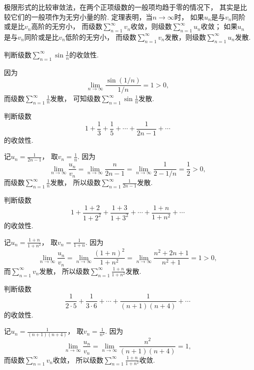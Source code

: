 极限形式的比较审敛法，在两个正项级数的一般项均趋于零的情况下，
其实是比较它们的一般项作为无穷小量的阶.
定理表明，当\(n \to \infty\)时，
如果\(u_n\)是与\(v_n\)同阶或是比\(v_n\)高阶的无穷小，
而级数\(\sum_{n=1}^\infty v_n\)收敛，则级数\(\sum_{n=1}^\infty u_n\)收敛；
如果\(u_n\)是与\(v_n\)同阶或是比\(v_n\)低阶的无穷小，
而级数\(\sum_{n=1}^\infty v_n\)发散，则级数\(\sum_{n=1}^\infty u_n\)发散.

\begin{example}
判断级数\(\sum_{n=1}^\infty \sin\frac{1}{n}\)的收敛性.
\begin{solution}
因为\[
	\lim_{n\to\infty} \frac{\sin(1/n)}{1/n} = 1 > 0,
\]
而级数\(\sum_{n=1}^\infty \frac{1}{n}\)发散，
可知级数\(\sum_{n=1}^\infty \sin\frac{1}{n}\)发散.
\end{solution}
\end{example}

\begin{example}
判断级数\[
	1 + \frac{1}{3} + \frac{1}{5} + \dotsb + \frac{1}{2n-1} + \dotsb
\]的收敛性.
\begin{solution}
记\(u_n = \frac{1}{2n-1}\)，
取\(v_n = \frac{1}{n}\).
因为\[
	\lim_{n\to\infty} \frac{u_n}{v_n}
	= \lim_{n\to\infty} \frac{n}{2n-1}
	= \lim_{n\to\infty} \frac{1}{2-1/n}
	= \frac{1}{2}
	> 0,
\]
而级数\(\sum_{n=1}^\infty \frac{1}{n}\)发散，
所以级数\(\sum_{n=1}^\infty \frac{1}{2n-1}\)发散.
\end{solution}
\end{example}

\begin{example}
判断级数\[
	1 + \frac{1+2}{1+2^2} + \frac{1+3}{1+3^2} + \dotsb + \frac{1+n}{1+n^2} + \dotsb
\]的收敛性.
\begin{solution}
记\(u_n = \frac{1+n}{1+n^2}\)，
取\(v_n = \frac{1}{1+n}\).
因为\[
	\lim_{n\to\infty} \frac{u_n}{v_n}
	= \lim_{n\to\infty} \frac{(1+n)^2}{1+n^2}
	= \lim_{n\to\infty} \frac{n^2 + 2n + 1}{n^2 + 1}
	= 1 > 0,
\]
而\(\sum_{n=1}^\infty v_n\)发散，
所以级数\(\sum_{n=1}^\infty \frac{1+n}{1+n^2}\)发散.
\end{solution}
\end{example}

\begin{example}
判断级数\[
	\frac{1}{2\cdot5} + \frac{1}{3\cdot6} + \dotsb + \frac{1}{(n+1)(n+4)} + \dotsb
\]的收敛性.
\begin{solution}
记\(u_n = \frac{1}{(n+1)(n+4)}\)，
取\(v_n = \frac{1}{n^2}\).
因为\[
	\lim_{n\to\infty} \frac{u_n}{v_n}
	= \lim_{n\to\infty} \frac{n^2}{(n+1)(n+4)}
	= 1,
\]
而级数\(\sum_{n=1}^\infty v_n\)收敛，
所以级数\(\sum_{n=1}^\infty \frac{1+n}{1+n^2}\)收敛.
\end{solution}
\end{example}

